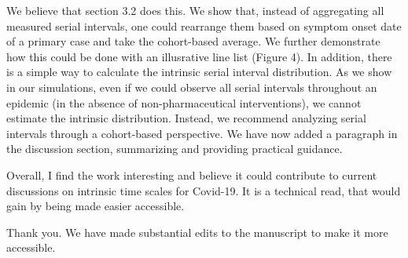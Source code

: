 \documentclass[12pt]{article}
\newcommand{\revtext}{\textsf}
\begin{document}
We believe that section 3.2 does this. We show that, instead of aggregating all measured serial intervals, one could rearrange them based on symptom onset date of a primary case and take the cohort-based average. We further demonstrate how this could be done with an illusrative line list (Figure 4). In addition, there is a simple way to calculate the intrinsic serial interval distribution. As we show in our simulations, even if we could observe all serial intervals throughout an epidemic (in the absence of non-pharmaceutical interventions), we cannot estimate the intrinsic distribution. Instead, we recommend analyzing serial intervals through a cohort-based perspective. We have now added a paragraph in the discussion section, summarizing and providing practical guidance.

\revtext{Overall, I find the work interesting and believe it could contribute to current discussions on intrinsic time scales for Covid-19. It is a technical read, that would gain by being made easier accessible.}

Thank you. We have made substantial edits to the manuscript to make it more accessible.


\end{document}
